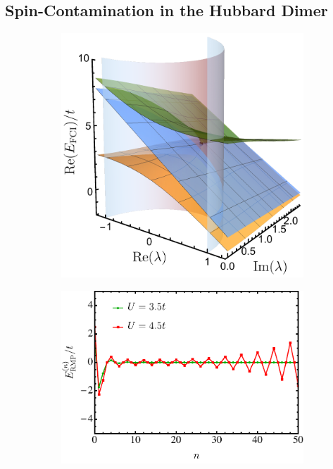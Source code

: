 \documentclass[aps,prb,reprint,noshowkeys,superscriptaddress]{revtex4-1}
\begin{document}
\subsection{Spin-Contamination in the Hubbard Dimer}
\label{sec:spin_cont}

\begin{figure}
	\begin{subfigure}{0.32\textwidth}
	\includegraphics[height=0.75\textwidth]{fig4a}	
    \end{subfigure}
    \begin{subfigure}{0.32\textwidth}
	\includegraphics[height=0.75\textwidth]{fig4b}

\end{subfigure}
\end{figure}
\end{document}
